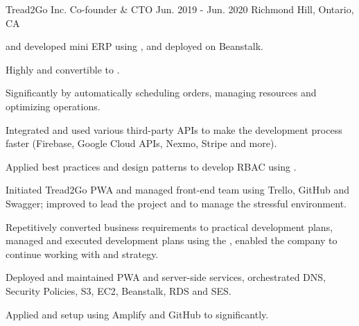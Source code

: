 \begin{cventries}
  \cventry
    {Tread2Go Inc.} %
    {Co-founder \& CTO} %
    {Jun. 2019 - Jun. 2020} %
    {Richmond Hill, Ontario, CA} %
    {
      \begin{cvitems} %
        \item { and developed mini ERP  using ,  and deployed on  Beanstalk.}
          \begin{cvsubitems}
            \item {Highly  and convertible to .}
            \item {Significantly  by automatically scheduling orders, managing resources and optimizing operations.}
            \item {Integrated and used various third-party APIs to make the development process faster  (Firebase, Google Cloud APIs, Nexmo, Stripe and more).}
            \item {Applied best practices and design patterns to develop RBAC using .}
          \end{cvsubitems}
        \item {Initiated Tread2Go  PWA and managed  front-end team using Trello, GitHub and Swagger; improved  to lead the project and  to manage the stressful environment.}
          \begin{cvsubitems}
            \item {Repetitively converted business requirements to practical development plans, managed and executed development plans using the , enabled the company to continue working with  and  strategy.}
          \end{cvsubitems}
        \item {Deployed and maintained PWA and server-side services, orchestrated DNS, Security Policies, S3, EC2, Beanstalk, RDS and SES.}
          \begin{cvsubitems}
            \item {Applied and setup  using Amplify and GitHub to  significantly.}
          \end{cvsubitems}
      \end{cvitems}
    }


\end{cventries}
